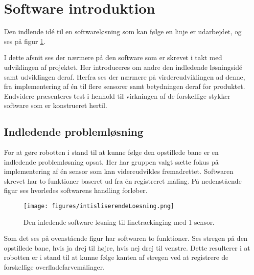 \section{Software introduktion}
Den indlende idé til en softwareløsning som kan følge en linje er udarbejdet, og ses på figur \ref{init_software}.

I dette afsnit ses der nærmere på den software som er skrevet i takt med udviklingen af projektet. Her introduceres om andre den indledende løsningsidé samt udviklingen deraf. Herfra ses der nærmere på virdereudviklingen ad denne, fra implementering af én til flere sensorer samt betydningen deraf for produktet.
\newline 
Endvidere præsenteres test i henhold til virkningen af de forskellige stykker software som er konstrueret hertil. 

\subsection{Indledende problemløsning}
For at gøre robotten i stand til at kunne følge den opstillede bane er en indledende problemløsning opsat. Her har gruppen valgt sætte fokus på implementering af én sensor som kan videreudvikles fremadrettet. 
\newline 
Softwaren skrevet har to funktioner baseret ud fra én registreret måling. På nedenstående figur ses hvorledes softwarens handling forløber.

\begin{figure}[h!]
  \centering
  \texttt{[image: figures/intisliserendeLoesning.png]}
  \caption{Den inledende software løsning til linetrackinging med 1 sensor.}
  \label{init_software}
\end{figure}

Som det ses på ovenstående figur har softwaren to funktioner. Ses stregen på den opstillede bane, hvis ja drej til højre, hvis nej drej til venstre. Dette resulterer i at robotten er i stand til at kunne følge kanten af stregen ved at registrere de forskellige overfladefarvemålinger.  


